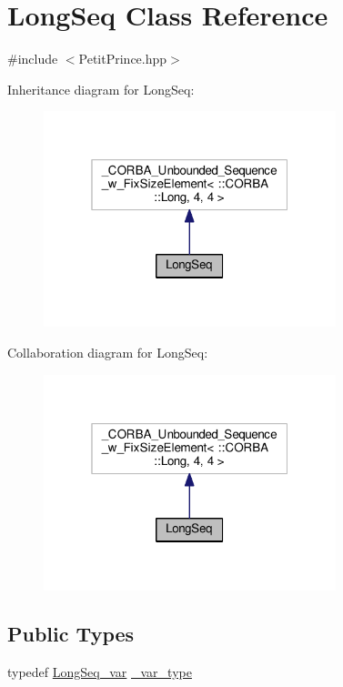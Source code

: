 \hypertarget{class_long_seq}{}\section{Long\+Seq Class Reference}
\label{class_long_seq}


{\ttfamily \#include $<$Petit\+Prince.\+hpp$>$}



Inheritance diagram for Long\+Seq\+:
\nopagebreak
\begin{figure}[H]
\begin{center}
\leavevmode
\includegraphics[width=241pt]{class_long_seq__inherit__graph}
\end{center}
\end{figure}


Collaboration diagram for Long\+Seq\+:
\nopagebreak
\begin{figure}[H]
\begin{center}
\leavevmode
\includegraphics[width=241pt]{class_long_seq__coll__graph}
\end{center}
\end{figure}
\subsection*{Public Types}
\begin{DoxyCompactItemize}
\item 
typedef \hyperlink{class_long_seq__var}{Long\+Seq\+\_\+var} \hyperlink{class_long_seq_afea7fc8a670b2b5e81f47b0240844579}{\+\_\+var\+\_\+type}
\end{DoxyCompactItemize}
